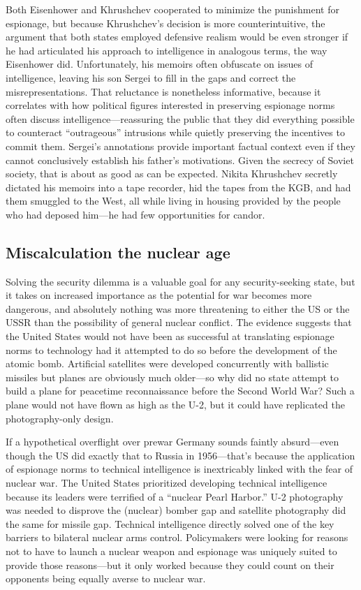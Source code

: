 \documentclass[11pt]{memoir}
\begin{document}
Both Eisenhower and Khrushchev cooperated to minimize the punishment for espionage, but because Khrushchev's decision is more counterintuitive, the argument that both states employed defensive realism would be even stronger if he had articulated his approach to intelligence in analogous terms, the way Eisenhower did. Unfortunately, his memoirs often obfuscate on issues of intelligence, leaving his son Sergei to fill in the gaps and correct the misrepresentations. That reluctance is nonetheless informative, because it correlates with how political figures interested in preserving espionage norms often discuss intelligence---reassuring the public that they did everything possible to counteract ``outrageous'' intrusions while quietly preserving the incentives to commit them. Sergei's annotations provide important factual context even if they cannot conclusively establish his father's motivations. Given the secrecy of Soviet society, that is about as good as can be expected. Nikita Khrushchev secretly dictated his memoirs into a tape recorder, hid the tapes from the KGB, and had them smuggled to the West, all while living in housing provided by the people who had deposed him---he had few opportunities for candor.

\subsection{Miscalculation the nuclear age}
Solving the security dilemma is a valuable goal for any security-seeking state, but it takes on increased importance as the potential for war becomes more dangerous, and absolutely nothing was more threatening to either the US or the USSR than the possibility of general nuclear conflict. The evidence suggests that the United States would not have been as successful at translating espionage norms to technology had it attempted to do so before the development of the atomic bomb. Artificial satellites were developed concurrently with ballistic missiles but planes are obviously much older---so why did no state attempt to build a plane for peacetime reconnaissance before the Second World War? Such a plane would not have flown as high as the U-2, but it could have replicated the photography-only design.


If a hypothetical overflight over prewar Germany sounds faintly absurd---even though the US did exactly that to Russia in 1956---that's because the application of espionage norms to technical intelligence is inextricably linked with the fear of nuclear war. The United States prioritized developing technical intelligence because its leaders were terrified of a ``nuclear Pearl Harbor.'' U-2 photography was needed to disprove the (nuclear) bomber gap and satellite photography did the same for missile gap. Technical intelligence directly solved one of the key barriers to bilateral nuclear arms control. Policymakers were looking for reasons not to have to launch a nuclear weapon and espionage was uniquely suited to provide those reasons---but it only worked because they could count on their opponents being equally averse to nuclear war.
\end{document}
